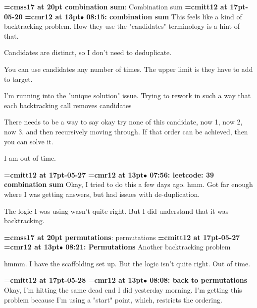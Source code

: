 {\medskip\noindent\bf\font\titlefont=cmss17 at 20pt combination sum}: Combination sum
{\medskip\noindent\bf\font\titlefont=cmitt12 at 17pt-05-20}\medskip
{\smallskip\noindent\bf\font\titlefont=cmr12 at 13pt\titlefont $\bullet$ 08:15: combination sum}\smallskip
This feels like a kind of backtracking problem. How they use the "candidates" terminology is a hint of that.
\par

Candidates are distinct, so I don't need to deduplicate.
\par

You can use candidates any number of times. The upper limit is they have to add to target.
\par

I'm running into the "unique solution" issue. Trying to rework in such a way that each backtracking call removes candidates
\par

There needs to be a way to say okay try none of this candidate, now 1, now 2, now 3. and then recursively moving through. If that order can be achieved, then you can solve it.
\par

I am out of time.
\par

{\medskip\noindent\bf\font\titlefont=cmitt12 at 17pt-05-27}\medskip
{\smallskip\noindent\bf\font\titlefont=cmr12 at 13pt\titlefont $\bullet$ 07:56: leetcode: 39 combination sum}\smallskip
Okay, I tried to do this a few days ago. hmm. Got far enough where I was getting answers, but had issues with de-duplication.
\par

The logic I was using wasn't quite right. But I did understand that it was backtracking.
\par

{\medskip\noindent\bf\font\titlefont=cmss17 at 20pt permutations}: permutations
{\medskip\noindent\bf\font\titlefont=cmitt12 at 17pt-05-27}\medskip
{\smallskip\noindent\bf\font\titlefont=cmr12 at 13pt\titlefont $\bullet$ 08:21: Permutations}\smallskip
Another backtracking problem
\par

hmmm. I have the scaffolding set up. But the logic isn't quite right. Out of time.
\par

{\medskip\noindent\bf\font\titlefont=cmitt12 at 17pt-05-28}\medskip
{\smallskip\noindent\bf\font\titlefont=cmr12 at 13pt\titlefont $\bullet$ 08:08: back to permutations}\smallskip
Okay, I'm hitting the same dead end I did yesterday morning. I'm getting this problem because I'm using a "start" point, which, restricts the ordering.
\par

